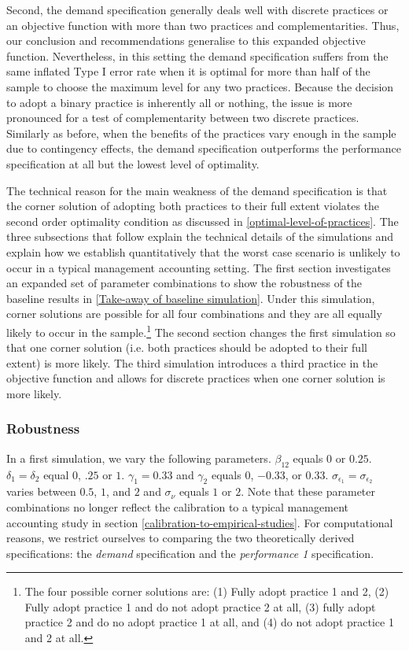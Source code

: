 \documentclass[12pt]{article}
\begin{document}
Second, the demand specification generally deals well with discrete practices or an objective function with more than two practices and complementarities. Thus, our conclusion and recommendations generalise to this expanded objective function. Nevertheless, in this setting the demand specification suffers from the same inflated Type I error rate when it is optimal for more than half of the sample to choose the maximum level for any two practices. Because the decision to adopt a binary practice is inherently all or nothing, the issue is more pronounced for a test of complementarity between two discrete practices. Similarly as before, when the benefits of the practices vary enough in the sample due to contingency effects, the demand specification outperforms the performance specification at all but the lowest level of optimality.

The technical reason for the main weakness of the demand specification is that the corner solution of adopting both practices to their full extent violates the second order optimality condition as discussed in \ref{optimal-level-of-practices}. The three subsections that follow explain the technical details of the simulations and explain how we establish quantitatively that the worst case scenario is unlikely to occur in a typical management accounting setting. The first section investigates an expanded set of parameter combinations to show the robustness of the baseline results in \ref{Take-away of baseline simulation}. Under this simulation, corner solutions are possible for all four combinations and they are all equally likely to occur in the sample.\footnote{The four possible corner solutions are: (1) Fully adopt practice 1 and 2, (2) Fully adopt practice 1 and do not adopt practice 2 at all, (3) fully adopt practice 2 and do no adopt practice 1 at all, and (4) do not adopt practice 1 and 2 at all.} The second section changes the first simulation so that one corner solution (i.e. both practices should be adopted to their full extent) is more likely. The third simulation introduces a third practice in the objective function and allows for discrete practices when one corner solution is more likely. 

\subsubsection{Robustness}

In a first simulation, we vary the following parameters. $\beta_{12}$ equals $0$ or $0.25$. $\delta_1 = \delta_2$ equal $0$, $.25$ or $1$. $\gamma_1 = 0.33$ and $\gamma_2$ equals $0$, $-0.33$, or $0.33$. $\sigma_{\epsilon_1} = \sigma_{\epsilon_2}$ varies between $0.5$, $1$, and $2$ and $\sigma_{\nu}$ equals $1$ or $2$. Note that these parameter combinations no longer reflect the calibration to a typical management accounting study in section \ref{calibration-to-empirical-studies}. For computational reasons, we restrict ourselves to comparing the two theoretically derived specifications: the \emph{demand} specification and the \emph{performance 1} specification.
\end{document}

